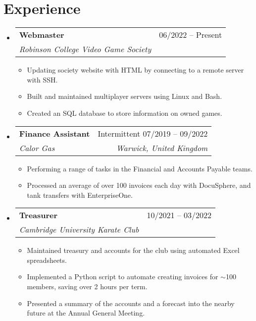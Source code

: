 \documentclass[a4paper,11pt]{article}
\makeatletter
\newcommand{\resumeItem}[1]{
  \item{
    {#1 \vspace{-4pt}}
  }
}
\newcommand{\resumeSubheading}[4]{
  \vspace{-2pt}\item
    \begin{tabular*}{0.97\textwidth}[t]{l@{\extracolsep{\fill}}r}
      \textbf{#1} & #2 \\
      \textit{\small #3} & \textit{\small #4} \\
    \end{tabular*}\vspace{-10pt}
}
\newcommand{\resumeSubHeadingListStart}{\begin{itemize}[leftmargin=0.15in, label={}]}
\newcommand{\resumeSubHeadingListEnd}{\end{itemize}}
\newcommand{\resumeItemListStart}{\begin{itemize}}
\newcommand{\resumeItemListEnd}{\end{itemize}\vspace{-2pt}}
\makeatother
\begin{document}
\section{Experience}
\resumeSubHeadingListStart
\resumeSubheading
        {Webmaster}{06/2022 -- Present}
        {Robinson College Video Game Society}{}
    \resumeItemListStart
        \small\resumeItem{Updating society website with HTML by connecting to a remote server with SSH.}
        \resumeItem{Built and maintained multiplayer servers using Linux and Bash.}
        \resumeItem{Created an SQL database to store information on owned games.}
    \resumeItemListEnd
\begin{comment}
    \resumeSubheading
        {Treasurer}{June 2022 -- Present}
        {Robinson College Video Game Society}{}
    \resumeItemListStart
        \small\resumeItem{Maintained society accounts}
        \resumeItem{Run society events with the committee.}
    \resumeItemListEnd

    \resumeSubheading
        {Chairperson}{June 2022 -- Present}
        {Robinson College Board Game Society}{}
    \resumeItemListStart
        \small\resumeItem{Organised society meetings}
        \resumeItem{Created Excel spreadsheet to maintain society funds.}
    \resumeItemListEnd

    \resumeSubheading
        {Chairperson}{June 2022 -- Present}
        {Robinson College RPG Society}{}
\end{comment}
    \resumeSubheading
      {Finance Assistant}{Intermittent 07/2019 -- 09/2022}
      {Calor Gas}{Warwick, United Kingdom}
      \resumeItemListStart
        \small\resumeItem{Performing a range of tasks in the Financial and Accounts Payable teams.}
        \resumeItem{Processed an average of over 100 invoices each day with DocuSphere, and tank transfers with EnterpriseOne.}
        \resumeItemListEnd

\begin{comment}
    \resumeSubheading
        {Secretary}{June 2021 -- June 2022}
        {Robinson College Video Game Society}{}
    \resumeItemListStart
        \small\resumeItem{Minuted the society's Annual General Meeting.}
    \resumeItemListEnd
\end{comment}  
    \resumeSubheading
      {Treasurer}{10/2021 -- 03/2022}
      {Cambridge University Karate Club}{}
      \resumeItemListStart
        \small\resumeItem{Maintained treasury and accounts for the club using automated Excel spreadsheets.}
        \resumeItem{Implemented a Python script to automate creating invoices for $\sim$100 members, saving over 2 hours per term.}
        \resumeItem{Presented a summary of the accounts and a forecast into the nearby future at the Annual General Meeting.}
        \resumeItemListEnd
\begin{comment}
    \resumeSubheading
        {Crew Member}{October 2017 -- May 2020}
        {McDonald's}{Leamington Spa, United Kingdom}
    \resumeItemListStart
        \small\resumeItem{Experience working in a high-paced dynamic environment}
    \resumeItemListEnd
\end{comment}
\resumeSubHeadingListEnd
\end{document}
